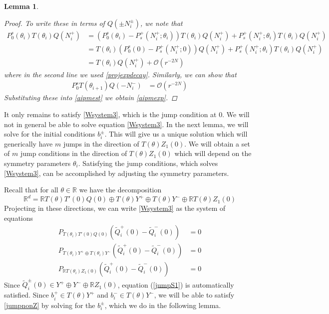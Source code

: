 \documentclass[12pt]{elsarticle}
\def\R{{\mathbb R}}
\newtheorem{lemma}{Lemma}
\begin{document}
\begin{lemma}
\begin{proof}
To write these in terms of $Q(\pm N_i^\pm)$, we note that
\begin{align*}
P_0^s(\theta_i) T(\theta_i) Q(N_i^+) &= (P_0^s(\theta_i) - P_s^+(N_i^+; \theta_i)) T(\theta_i) Q(N_i^+) + P_s^+(N_i^+; \theta_i) T(\theta_i) Q(N_i^+) \\
&= T(\theta_i)(P_0^s(0) - P_s^+(N_i^+; 0)) Q(N_i^+) + P_s^+(N_i^+; \theta_i) T(\theta_i) Q(N_i^+) \\
&= T(\theta_i) Q(N_i^+) + \mathcal{O}(r^{-2N}) 
\end{align*}
where in the second line we used \eqref{projexpdecay}. Similarly, we can show that 
\begin{align*}
P_0^s T(\theta_{i+1}) Q(-N_i^-) &= \mathcal{O}(r^{-2N})
\end{align*}
Substituting these into \eqref{aipmest} we obtain \eqref{aipmexp}.
\end{proof}
\end{lemma}

It only remains to satisfy \eqref{Wsystem3}, which is the jump condition at 0. We will not in general be able to solve equation \eqref{Wsystem3}. In the next lemma, we will solve for the initial conditions $b_i^\pm$. This will give us a unique solution which will generically have $m$ jumps in the direction of $T(\theta) Z_1(0)$. We will obtain a set of $m$ jump conditions in the direction of $T(\theta) Z_1(0)$ which will depend on the symmetry parameters $\theta_i$. Satisfying the jump conditions, which solves \eqref{Wsystem3}, can be accomplished by adjusting the symmetry parameters.

Recall that for all $\theta \in \R$ we have the decomposition
\[
\R^d = \R T(\theta) T'(0)Q(0) \oplus T(\theta) Y^+ \oplus T(\theta) Y^- \oplus \R T(\theta) Z_1(0)
\]
Projecting in these directions, we can write \eqref{Wsystem3} as the system of equations
\begin{align}
P_{T(\theta_i)T'(0)Q(0)}\left( \tilde{Q}_i^+(0) - \tilde{Q}_i^-(0) \right) &= 0 \label{jumpS1} \\
P_{T(\theta_i)Y^+ \oplus T(\theta_i)Y^-}\left( \tilde{Q}_i^+(0) - \tilde{Q}_i^-(0) \right) &= 0 \label{jumpnonZ} \\
P_{\R T(\theta_i)Z_1(0)} \left( \tilde{Q}_i^+(0) - \tilde{Q}_i^-(0) \right) &= 0 \label{jumpZ}
\end{align}
Since $\tilde{Q}_i^\pm(0) \in Y^+ \oplus Y^- \oplus \R Z_1(0)$, equation (\ref{jumpS1}) is automatically satisfied. Since $b_i^+ \in T(\theta) Y^+$ and $b_i^- \in T(\theta) Y^-$, we will be able to satisfy \eqref{jumpnonZ} by solving for the $b_i^\pm$, which we do in the following lemma.
\end{document}
